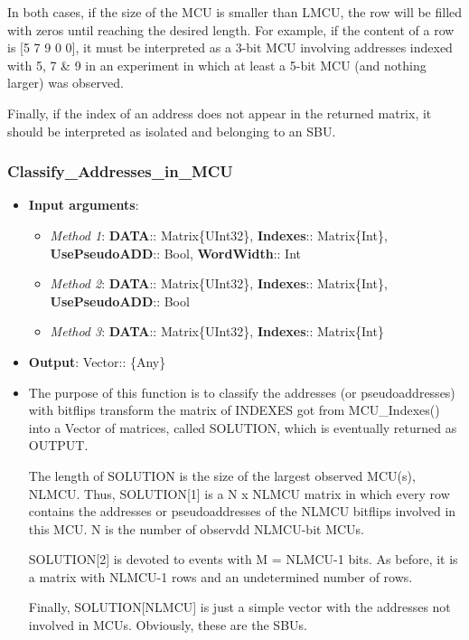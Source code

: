 \begin{itemize}
     In both cases, if the size of the MCU is smaller than LMCU, the row will be filled with zeros until
     reaching the desired length. For example, if the content of a row is [5 7 9 0 0], it must be interpreted
     as a 3-bit MCU involving addresses indexed with 5, 7 \& 9 in an experiment in which at least a 5-bit 
     MCU (and nothing larger) was observed.
     
 	Finally, if the index of an address does not appear in the returned matrix, it should be interpreted as  isolated and belonging to an SBU.
 	
 \end{itemize}
%
\subsubsection*{Classify\_Addresses\_in\_MCU}
%
\begin{itemize}
	\item \textbf{Input arguments}: 
		\begin{itemize}
			\item \textit{Method 1}: \textbf{DATA}:: Matrix\{UInt32\}, 
			\textbf{Indexes}:: Matrix\{Int\}, 
			\textbf{UsePseudoADD}:: Bool, 
			\textbf{WordWidth}:: Int
			\item \textit{Method 2}: \textbf{DATA}:: Matrix\{UInt32\}, 
			\textbf{Indexes}:: Matrix\{Int\}, 
			\textbf{UsePseudoADD}:: Bool 
			\item \textit{Method 3}: \textbf{DATA}:: Matrix\{UInt32\}, 
			\textbf{Indexes}:: Matrix\{Int\}
		\end{itemize}
	\item \textbf{Output}: Vector:: \{Any\}
	\item The purpose of this function is to classify the addresses (or pseudoaddresses) with bitflips transform the matrix of INDEXES got from MCU\_Indexes() into a Vector of matrices, called SOLUTION, which is eventually returned as OUTPUT.
	 
	The length of SOLUTION is the size of the largest observed MCU(s), NLMCU. Thus, SOLUTION[1] is 	a N x NLMCU matrix in which every row contains the addresses or pseudoaddresses of the NLMCU 	bitflips involved in this MCU. N is the number of observdd NLMCU-bit MCUs.
	
	SOLUTION[2] is devoted to events with M = NLMCU-1 bits. As before, it is a matrix with NLMCU-1 	rows and an undetermined number of rows.
	
	Finally, SOLUTION[NLMCU] is just a simple vector with the addresses not involved in MCUs. Obviously, these are the SBUs.
\end{itemize}

